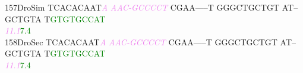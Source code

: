 \documentclass[11pt,twoside,reqno,a4paper]{article}
\begin{document}
{157\hspace*{1\charwidth}DroSim	TCACACAAT\textit{\textcolor{violet}{A}}	\textit{\textcolor{violet}{A}}\textit{\textcolor{violet}{A}}\textit{\textcolor{violet}{C}}\textit{\textcolor{violet}{-}}\textit{\textcolor{violet}{G}}\textit{\textcolor{violet}{C}}\textit{\textcolor{violet}{C}}\textit{\textcolor{violet}{C}}\textit{\textcolor{violet}{C}}\textit{\textcolor{violet}{T}}	CGAA-----T	GGGCTGCTGT	AT--GCTGTA	T\textcolor{green}{G}\textcolor{green}{T}\textcolor{green}{G}\textcolor{green}{T}\textcolor{green}{G}\textcolor{green}{C}\textcolor{green}{C}\textcolor{green}{A}\textcolor{green}{T}	\\
\hspace*{4\charwidth}\hspace*{7\charwidth}\hspace*{9\charwidth}\textit{\textcolor{violet}{11.1}}\hspace*{1\charwidth}\hspace*{1\charwidth}\hspace*{1\charwidth}\hspace*{1\charwidth}\hspace*{1\charwidth}\hspace*{38\charwidth}\textcolor{green}{7.4}\hspace*{1\charwidth}\\
158\hspace*{1\charwidth}DroSec	TCACACAAT\textit{\textcolor{violet}{A}}	\textit{\textcolor{violet}{A}}\textit{\textcolor{violet}{A}}\textit{\textcolor{violet}{C}}\textit{\textcolor{violet}{-}}\textit{\textcolor{violet}{G}}\textit{\textcolor{violet}{C}}\textit{\textcolor{violet}{C}}\textit{\textcolor{violet}{C}}\textit{\textcolor{violet}{C}}\textit{\textcolor{violet}{T}}	CGAA-----T	GGGCTGCTGT	AT--GCTGTA	T\textcolor{green}{G}\textcolor{green}{T}\textcolor{green}{G}\textcolor{green}{T}\textcolor{green}{G}\textcolor{green}{C}\textcolor{green}{C}\textcolor{green}{A}\textcolor{green}{T}	\\
\hspace*{4\charwidth}\hspace*{7\charwidth}\hspace*{9\charwidth}\textit{\textcolor{violet}{11.1}}\hspace*{1\charwidth}\hspace*{1\charwidth}\hspace*{1\charwidth}\hspace*{1\charwidth}\hspace*{1\charwidth}\hspace*{38\charwidth}\textcolor{green}{7.4}\hspace*{1\charwidth}\\
}
\end{document}
